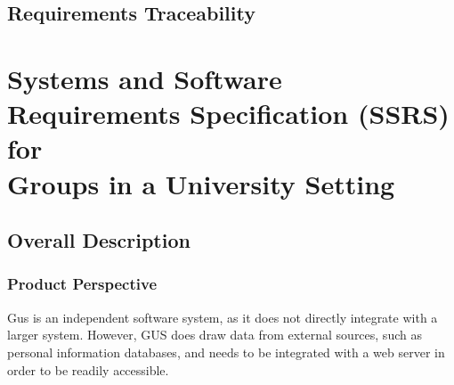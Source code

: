 \chapter{Requirements Traceability}
\part{Systems and Software Requirements Specification (SSRS) \\ for \\ Groups in a University Setting}
\chapter{Overall Description}
	\section{Product Perspective}
		Gus is an independent software system, as it does not directly
		integrate with a larger system. However, GUS does draw data from
		external sources, such as personal information databases, and
		needs to be integrated with a web server in order to be readily
		accessible.
